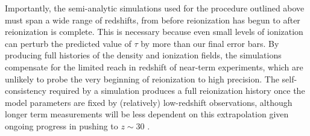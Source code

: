 \documentclass[twocolumn,aps,prd,nofootinbib,showpacs,superscriptaddress]{revtex4-1}
\begin{document}
Importantly, the semi-analytic simulations used for the procedure outlined above must span a wide range of redshifts, from before reionization has begun to after reionization is complete. This is necessary because even small levels of ionization can perturb the predicted value of $\tau$ by more than our final error bars. By producing full histories of the density and ionization fields, the simulations compensate for the limited reach in redshift of near-term experiments, which are unlikely to probe the very beginning of reionization to high precision. The self-consistency required by a simulation produces a full reionization history once the model parameters are fixed by (relatively) low-redshift observations, although longer term measurements will be less dependent on this extrapolation given ongoing progress in pushing to $z \sim 30$ \cite{taylor_et_al2012,burns2012,vedantham_et_al2014,bernardi_et_al2015}.
\end{document}
